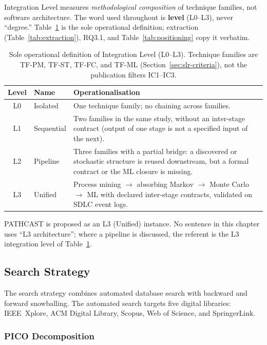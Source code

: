 Integration Level measures \emph{methodological composition} of technique
families, not software architecture. The word used throughout is
\textbf{level} (L0--L3), never ``degree.'' Table~\ref{tab:il-def} is the sole
operational definition; extraction (Table~\ref{tab:extraction}), RQ3.1, and
Table~\ref{tab:positioning} copy it verbatim.

\begin{table}[htbp]
\centering
\caption{Sole operational definition of Integration Level (L0--L3).
Technique families are TF-PM, TF-ST, TF-FC, and TF-ML
(Section~\ref{sec:slr-criteria}), not the publication filters IC1--IC3.}
\label{tab:il-def}
\small
\begin{tabular}{c l p{10.4cm}}
\toprule
\textbf{Level} & \textbf{Name} & \textbf{Operationalisation} \\
\midrule
L0 & Isolated & One technique family; no chaining across families. \\
L1 & Sequential & Two families in the same study, without an inter-stage
  contract (output of one stage is not a specified input of the next). \\
L2 & Pipeline & Three families with a partial bridge: a discovered or
  stochastic structure is reused downstream, but a formal contract or the ML
  closure is missing. \\
L3 & Unified & Process mining $\rightarrow$ absorbing Markov $\rightarrow$
  Monte Carlo $\rightarrow$ ML with declared inter-stage contracts,
  validated on SDLC event logs. \\
\bottomrule
\end{tabular}
\end{table}

\noindent PATHCAST is proposed as an L3 (Unified) instance. No sentence in this
chapter uses ``L3 architecture''; where a pipeline is discussed, the referent
is the L3 integration level of Table~\ref{tab:il-def}.


\subsection{Search Strategy}
\label{sec:slr-search}

The search strategy combines automated database search with backward and
forward snowballing. The automated search targets five digital libraries:
IEEE~Xplore, ACM Digital Library, Scopus, Web of Science, and SpringerLink.

\subsubsection{PICO Decomposition}

